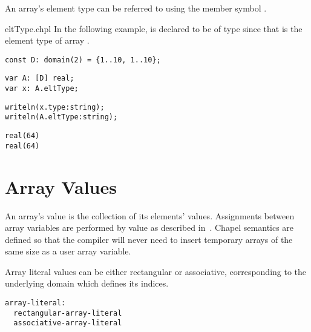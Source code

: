 %
%
An array's element type can be referred to using the member symbol
.

\begin{chapelexample}{eltType.chpl}
In the following example,  is declared to be of type
 since that is the element type of array .
\begin{chapelpre}
\begin{verbatim}
const D: domain(2) = {1..10, 1..10};
\end{verbatim}
\end{chapelpre}
\begin{chapel}
\begin{verbatim}
var A: [D] real;
var x: A.eltType;
\end{verbatim}
\end{chapel}
\begin{chapelpost}
\begin{verbatim}
writeln(x.type:string);
writeln(A.eltType:string);
\end{verbatim}
\end{chapelpost}
\begin{chapeloutput}
\begin{verbatim}
real(64)
real(64)
\end{verbatim}
\end{chapeloutput}
\end{chapelexample}

\section{Array Values}
\label{Array_Values}

An array's value is the collection of its elements' values.
Assignments between array variables are performed by value as
described in~.  Chapel semantics are defined so
that the compiler will never need to insert temporary arrays of the
same size as a user array variable.


Array literal values can be either rectangular or associative, corresponding to
the underlying domain which defines its indices. 

\begin{syntax}
\begin{verbatim}
array-literal:
  rectangular-array-literal
  associative-array-literal
\end{verbatim}
\end{syntax}

